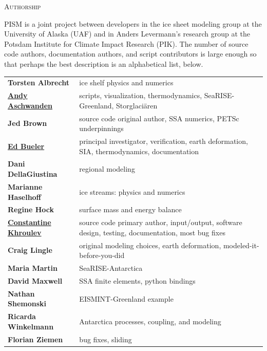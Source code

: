 \documentclass[titlepage,letterpaper,final]{scrartcl}
\begin{document}
\newpage
\phantom{bob}

\centerline{\textsc{Authorship}}
\bigskip

\normalspacing
PISM is a joint project between developers in the ice sheet modeling group at the University of Alaska (UAF) and in Anders Levermann's research group at the Potsdam Institute for Climate Impact Research (PIK).  The number of source code authors, documentation authors, and script contributors is large enough so that perhaps the best description is an alphabetical list, below.
\bigskip
\normalspacing

\renewcommand{\arraystretch}{1.3}
\begin{tabular}{ll}
\textbf{Torsten Albrecht} & ice shelf physics and numerics \\
\textbf{\underline{Andy Aschwanden}} & \begin{minipage}[t]{4in} scripts, visualization, thermodynamics, SeaRISE-Greenland, Storglaci\"aren  \end{minipage}  \\
\textbf{Jed Brown} & source code original author, SSA numerics, PETSc underpinnings \\
\textbf{\underline{Ed Bueler}} & \begin{minipage}[t]{4in} principal investigator, verification, earth deformation, SIA, thermodynamics, documentation  \end{minipage} \\
\textbf{Dani DellaGiustina} & regional modeling \\
\textbf{Marianne Haselhoff} & ice streams: physics and numerics\\
\textbf{Regine Hock} & surface mass and energy balance \\
\textbf{\underline{Constantine Khroulev}} & \begin{minipage}[t]{4in} source code primary author, input/output, software design, testing, documentation, most bug fixes \end{minipage} \\
\textbf{Craig Lingle}\index{People!Lingle, Craig} & original modeling choices, earth deformation, modeled-it-before-you-did \\
\textbf{Maria Martin} & SeaRISE-Antarctica \\
\textbf{David Maxwell} & SSA finite elements, python bindings \\
\textbf{Nathan Shemonski} & EISMINT-Greenland example \\
\textbf{Ricarda Winkelmann} & Antarctica processes, coupling, and modeling  \\
\textbf{Florian Ziemen} & bug fixes, sliding \\
\end{tabular}
\end{document}

